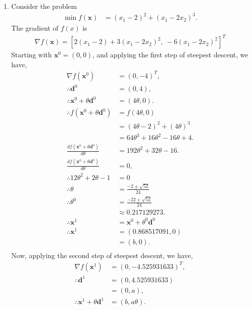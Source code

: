 \documentclass[a4paper,11pt]{article}
\newcommand{\ds}{\displaystyle}
\begin{document}
{{\begin{enumerate}[leftmargin=*]
		\item Consider the problem 
			\begin{align*} 
				\min f(\mathbf{x}) & = (x_1 - 2)^2 + (x_1 - 2x_2)^3.
			\end{align*}
			The gradient of $\ds{f(x)}$ is 
			\begin{align*}
				\nabla f(\mathbf{x}) = \left[2(x_1-2) + 3(x_1-2x_2)^2,\: -6(x_1-2x_2)^2\right]^T
			\end{align*}
			Starting with $\ds{\mathbf{x}^0 = (0,0)}$, and applying the first step of steepest descent, we have,
			\begin{align*}
				\nabla f(\mathbf{x}^0) & = (0, -4)^T, \\
				\therefore \mathbf{d}^0 & = (0, 4), \\
				\therefore \mathbf{x}^0 + \theta\mathbf{d}^0 & = (4\theta, 0). \\
				\therefore f\left(\mathbf{x}^0 + \theta\mathbf{d}^0\right) & = f(4\theta, 0)\\
																		   & = (4\theta-2)^2 + (4\theta)^3 \\
																		   & = 64\theta^3 + 16\theta^2 - 16\theta + 4. \\
				\frac{df\left(\mathbf{x}^0 + \theta\mathbf{d}^0\right)}{d\theta} & = 192\theta^2 + 32\theta -16. \\
				\frac{df\left(\mathbf{x}^0 + \theta\mathbf{d}^0\right)}{d\theta} & = 0, \\
				\therefore 12\theta^2 + 2\theta - 1 & = 0 \\
				\therefore \theta & = \frac{-2\pm\sqrt{52}}{24} \\
				\therefore \theta^0 & = \frac{-22 + \sqrt{52}}{24} \\
								  & \approx 0.217129273. \\
				\therefore \mathbf{x}^1 & = \mathbf{x}^0 + \theta^0\mathbf{d}^0 \\
				\therefore \mathbf{x}^1 & = (0.868517091, 0) \\
										& = (b, 0). \\
			\end{align*}
			Now, applying the second step of steepest descent, we have, 
			\begin{align*}
				\nabla f(\mathbf{x}^1) & = (0, -4.525931633)^T, \\
				\therefore \mathbf{d}^1 & = (0, 4.525931633) \\
										& = (0, a), \\
				\therefore \mathbf{x}^1 + \theta\mathbf{d}^1 & = (b, a\theta). \\

\end{align*}
\end{enumerate}}}
\end{document}
